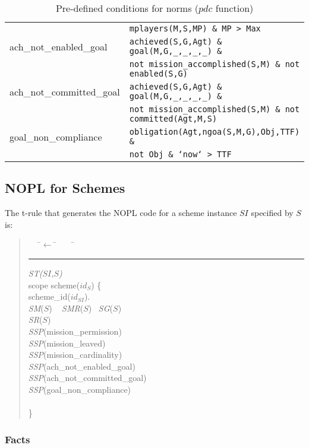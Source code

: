 \documentclass{article}
\newcommand{\code}[1]{\texttt{#1}}
\newenvironment{rwrule}[2]
{\begin{quote}\ttfamily\begin{tabbing}~~~\=$\leftarrow$ \= ~~~ \= \kill
     \ensuremath{#2}\\
     \rule[2pt]{6.5cm}{.3pt} \hfill \rwlabel{#1}\\}
{\end{tabbing}\end{quote}}
\newcommand{\rwlabel}[1]{{\scshape\itshape\textrm{#1}}}
\theoremstyle{definition} \newtheorem{definition}{Definition}
\begin{document}
\begin{table}[t]
{\begin{tabular}{l l}
                 & \code{mplayers(M,S,MP) \& MP > Max}\\
      ach\_not\_enabled\_goal &  \code{achieved(S,G,Agt) \& goal(M,G,\_,\_,\_,\_) \&}\\
                 & \code{not mission\_accomplished(S,M) \& not enabled(S,G)} \\
      ach\_not\_committed\_goal & \code{achieved(S,G,Agt) \& goal(M,G,\_,\_,\_,\_) \&}\\
                 & \code{not mission\_accomplished(S,M) \& not committed(Agt,M,S)} \\
     goal\_non\_compliance & \code{obligation(Agt,ngoa(S,M,G),Obj,TTF) \&}\\
                    & \code{not Obj \& `now` > TTF}\\
     \bottomrule
   \end{tabular}
   }
   \caption{Pre-defined conditions for norms ($pdc$ function)\label{tab:predefcond}}
\end{table}


\subsection{NOPL for Schemes}


The t-rule that generates the NOPL code for a scheme instance $SI$ specified by $S$ is:
\begin{rwrule}{ST($SI$,$S$)}
{}
scope scheme($id_S$) \{ \\
\> scheme\_id($id_{SI}$).\\
\> \rwlabel{SM}($S$) ~ \rwlabel{SMR}($S$) ~\rwlabel{SG}($S$) ~ \\
\> \rwlabel{SR}($S$) \\
\> \rwlabel{SSP}(mission\_permission) \\
\> \rwlabel{SSP}(mission\_leaved) \\
\> \rwlabel{SSP}(mission\_cardinality) \\
\> \rwlabel{SSP}(ach\_not\_enabled\_goal) \\
\> \rwlabel{SSP}(ach\_not\_committed\_goal) \\
\> \rwlabel{SSP}(goal\_non\_compliance) \\
\>\rwlabel{NS}\\
\}
\end{rwrule}

\subsubsection{Facts}
\end{document}
